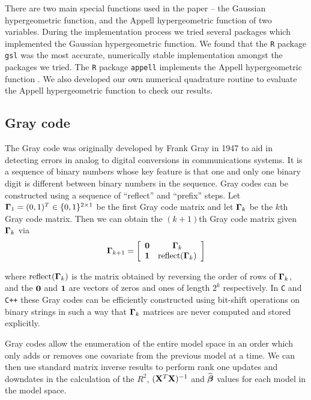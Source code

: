 There are two main special functions used in the paper -- the 
Gaussian hypergeometric function, and the Appell hypergeometric function
of two variables. During the 
implementation process we tried several packages which implemented the
Gaussian hypergeometric function.
We found that the {\tt R} package {\tt gsl} \citep{Hankin2006} was the most accurate, numerically
stable implementation amongst the packages we tried. The {\tt R} package {\tt appell}
implements the Appell
hypergeometric function \citep{Bove2013}. We also developed our own numerical quadrature routine to evaluate the Appell
hypergeometric function to check our results.



\subsection{Gray code} 
\label{sec:GrayCode}

\noindent
The Gray code was originally developed by Frank Gray in 1947 \cite[][Section 22.3]{PressEtal2007} to aid in detecting errors in analog to digital conversions in
communications systems. It is a sequence of binary numbers whose key feature is that
one and only one binary digit is different between binary numbers in the sequence. 
Gray codes can be constructed using a sequence of ``reflect'' and ``prefix'' steps.
Let ${\boldsymbol \Gamma}_1 = (0,1)^T \in \{0,1\}^{2\times 1}$ be the first Gray code matrix and let ${\boldsymbol \Gamma}_k$ be the $k$th Gray code matrix. Then we can obtain the $(k+1)$th Gray code matrix given ${\boldsymbol \Gamma}_k$ via 
$$
\displaystyle {\boldsymbol\Gamma}_{k+1} = \left[\begin{array}{cc}
{\bf0} & {\boldsymbol \Gamma}_k \\
{\bf 1}  & \mbox{reflect}({\boldsymbol \Gamma}_k)
\end{array} \right]
$$ 

\noindent where $\mbox{reflect}({\boldsymbol \Gamma}_k)$ is the matrix obtained by reversing the order of rows of ${\boldsymbol \Gamma}_k$, and the ${\bf 0}$ and ${\bf 1}$ are vectors of zeros and ones
of length $2^k$ respectively. In {\tt C} and {\tt C++} these Gray codes can be efficiently constructed
using bit-shift operations on binary strings in such a way that ${\boldsymbol \Gamma}_{k}$
matrices are never computed and stored explicitly.

Gray codes allow the enumeration of the entire model space in an order which only adds
or removes one covariate from the previous model at a time. We can then use standard matrix
inverse results to perform rank
one updates and downdates in the calculation of the $R^2$, $({\bf X}^T{\bf X})^{-1}$ and
$\widehat{{\boldsymbol \beta}}$ values for each model in the
model space.


